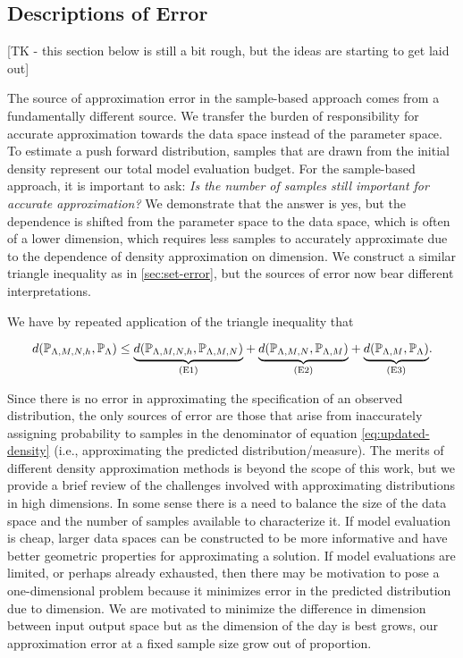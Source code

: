 \subsection{Descriptions of Error}\label{sec:sample-error}

[TK - this section below is still a bit rough, but the ideas are starting to get laid out]

The source of approximation error in the sample-based approach comes from a fundamentally different source.
We transfer the burden of responsibility for accurate approximation towards the data space instead of the parameter space.
To estimate a push forward distribution, samples that are drawn from the initial density represent our total model evaluation budget.
For the sample-based approach, it is important to ask: \emph{Is the number of samples still important for accurate approximation?}
We demonstrate that the answer is yes, but the dependence is shifted from the parameter space to the data space, which is often of a lower dimension, which requires less samples to accurately approximate due to the dependence of density approximation on dimension.
We construct a similar triangle inequality as in \ref{sec:set-error}, but the sources of error now bear different interpretations.

We have by repeated application of the triangle inequality that

\begin{equation}
\label{eq:sample-triangleineq}
d(\mathbb{P}_{{\Lambda}, M, N, h}, \mathbb{P}_{\Lambda}) \leq
\underset{ \text{(E1)} }{\underbrace{d(\mathbb{P}_{{\Lambda}, M, N, h},\mathbb{P}_{{\Lambda}, M, N})}} +
\underset{ \text{(E2)} }{\underbrace{d(\mathbb{P}_{{\Lambda}, M, N}, \mathbb{P}_{{\Lambda}, M}) }}+
\underset{ \text{(E3)} }{\underbrace{d(\mathbb{P}_{{\Lambda}, M}, \mathbb{P}_{\Lambda}) }}.
\end{equation}


Since there is no error in approximating the specification of an observed distribution, the only sources of error are those that arise from inaccurately assigning probability to samples in the denominator of equation \eqref{eq:updated-density} (i.e., approximating the predicted distribution/measure).
The merits of different density approximation methods is beyond the scope of this work, but we provide a brief review of the challenges involved with approximating distributions in high dimensions.
In some sense there is a need to balance the size of the data space and the number of samples available to characterize it.
If model evaluation is cheap, larger data spaces can be constructed to be more informative and have better geometric properties for approximating a solution.
If model evaluations are limited, or perhaps already exhausted, then there may be motivation to pose a one-dimensional problem because it minimizes error in the predicted distribution due to dimension.
We are motivated to minimize the difference in dimension between input output space but as the dimension of the day is best grows, our approximation error at a fixed sample size grow out of proportion.

